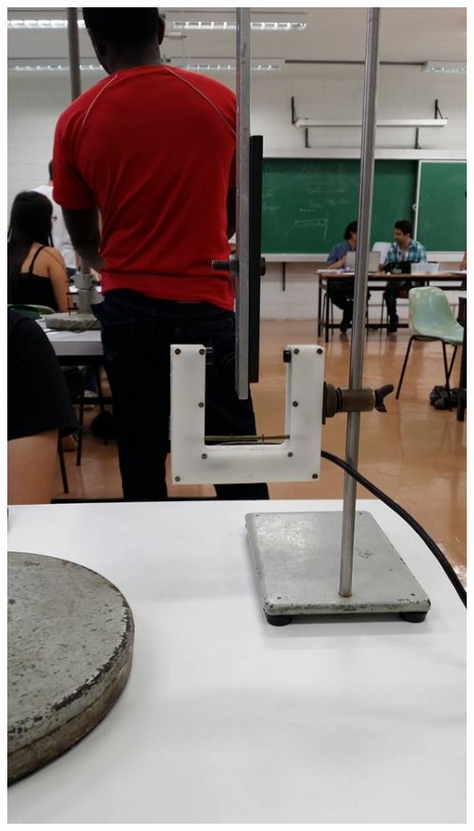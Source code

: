 \documentclass[12pt,a4paper]{article}
\begin{document}
\includegraphics[scale=0.30]{1.jpg} 
\end{document}
